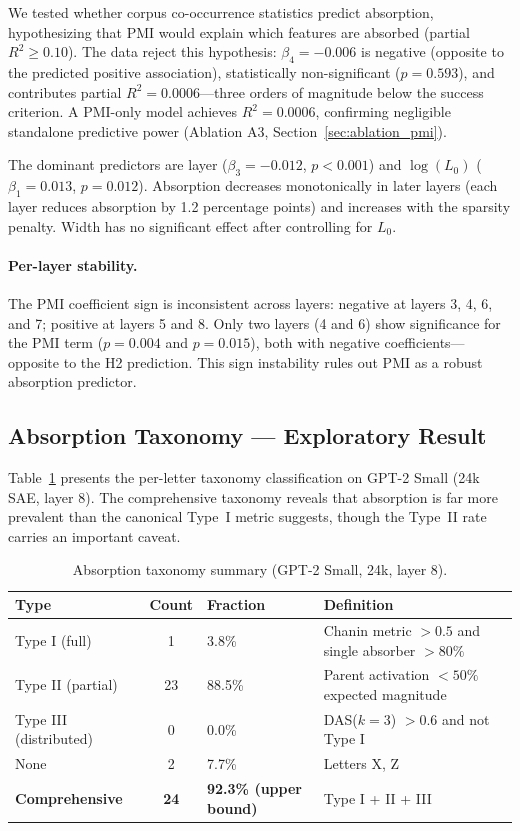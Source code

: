 \documentclass{article}
\begin{document}
We tested whether corpus co-occurrence statistics predict absorption, hypothesizing that PMI would explain which features are absorbed (partial $R^2 \geq 0.10$). The data reject this hypothesis: $\beta_4 = -0.006$ is negative (opposite to the predicted positive association), statistically non-significant ($p = 0.593$), and contributes partial $R^2 = 0.0006$---three orders of magnitude below the success criterion. A PMI-only model achieves $R^2 = 0.0006$, confirming negligible standalone predictive power (Ablation A3, Section~\ref{sec:ablation_pmi}).

The dominant predictors are layer ($\beta_3 = -0.012$, $p < 0.001$) and $\log(L_0)$ ($\beta_1 = 0.013$, $p = 0.012$). Absorption decreases monotonically in later layers (each layer reduces absorption by 1.2 percentage points) and increases with the sparsity penalty. Width has no significant effect after controlling for $L_0$.

\paragraph{Per-layer stability.} The PMI coefficient sign is inconsistent across layers: negative at layers 3, 4, 6, and 7; positive at layers 5 and 8. Only two layers (4 and 6) show significance for the PMI term ($p = 0.004$ and $p = 0.015$), both with negative coefficients---opposite to the H2 prediction. This sign instability rules out PMI as a robust absorption predictor.


\subsection{Absorption Taxonomy --- Exploratory Result}
\label{sec:results_taxonomy}

Table~\ref{tab:taxonomy_summary} presents the per-letter taxonomy classification on GPT-2 Small (24k SAE, layer 8). The comprehensive taxonomy reveals that absorption is far more prevalent than the canonical Type~I metric suggests, though the Type~II rate carries an important caveat.

\begin{table}[t]
  \caption{Absorption taxonomy summary (GPT-2 Small, 24k, layer 8).}
  \label{tab:taxonomy_summary}
  \centering
  \small
  \begin{tabular}{@{}lcll@{}}
    \toprule
    Type & Count & Fraction & Definition \\
    \midrule
    Type I (full) & 1 & 3.8\% & Chanin metric $> 0.5$ and single absorber $> 80\%$ \\
    Type II (partial) & 23 & 88.5\% & Parent activation $< 50\%$ expected magnitude \\
    Type III (distributed) & 0 & 0.0\% & DAS($k{=}3$) $> 0.6$ and not Type I \\
    None & 2 & 7.7\% & Letters X, Z \\
    \midrule
    \textbf{Comprehensive} & \textbf{24} & \textbf{92.3\% (upper bound)} & Type I + II + III \\
    \bottomrule
  \end{tabular}
\end{table}
\end{document}
